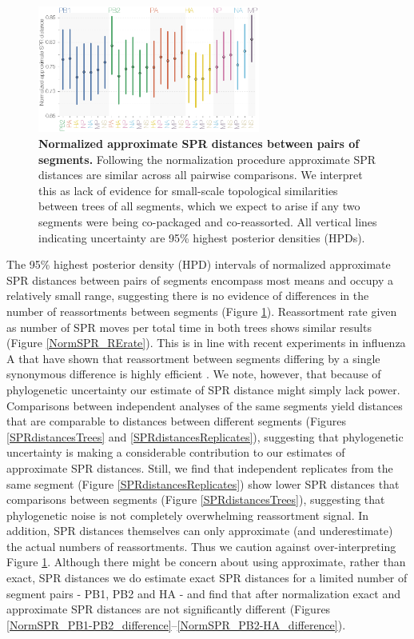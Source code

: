 \documentclass[11pt,oneside,letterpaper]{article}
\begin{document}
\begin{figure}[h]
	\centering		
	\includegraphics[width=0.65\textwidth]{figures/InfB_normalizedApproxSPR.png}
	\caption{\textbf{Normalized approximate SPR distances between pairs of segments.}
Following the normalization procedure approximate SPR distances are similar across all pairwise comparisons.
We interpret this as lack of evidence for small-scale topological similarities between trees of all segments, which we expect to arise if any two segments were being co-packaged and co-reassorted.
All vertical lines indicating uncertainty are 95\% highest posterior densities (HPDs).}
	\label{SPRdistances}
\end{figure}

The 95\% highest posterior density (HPD) intervals of normalized approximate SPR distances between pairs of segments encompass most means and occupy a relatively small range, suggesting there is no evidence of differences in the number of reassortments between segments (Figure \ref{SPRdistances}).
Reassortment rate given as number of SPR moves per total time in both trees shows similar results (Figure \ref{NormSPR_RErate}).
This is in line with recent experiments in influenza A that have shown that reassortment between segments differing by a single synonymous difference is highly efficient \citep{marshall2013}.
We note, however, that because of phylogenetic uncertainty our estimate of SPR distance might simply lack power.
Comparisons between independent analyses of the same segments yield distances that are comparable to distances between different segments (Figures \ref{SPRdistancesTrees} and \ref{SPRdistancesReplicates}), suggesting that phylogenetic uncertainty is making a considerable contribution to our estimates of approximate SPR distances.
Still, we find that independent replicates from the same segment (Figure \ref{SPRdistancesReplicates}) show lower SPR distances that comparisons between segments (Figure \ref{SPRdistancesTrees}), suggesting that phylogenetic noise is not completely overwhelming reassortment signal.
In addition, SPR distances themselves can only approximate (and underestimate) the actual numbers of reassortments.
Thus we caution against over-interpreting Figure \ref{SPRdistances}.
Although there might be concern about using approximate, rather than exact, SPR distances we do estimate exact SPR distances for a limited number of segment pairs - PB1, PB2 and HA - and find that after normalization exact and approximate SPR distances are not significantly different (Figures \ref{NormSPR_PB1-PB2_difference}--\ref{NormSPR_PB2-HA_difference}).
\end{document}
